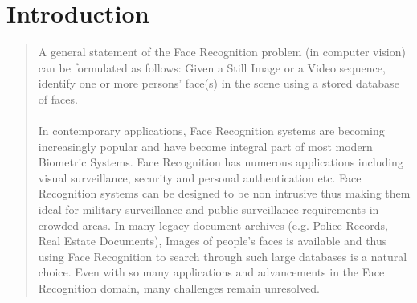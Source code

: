 \section*{Introduction}
\begin{quote}
A general statement of the Face Recognition problem (in computer vision) can be formulated as follows: Given a Still Image or a Video sequence, identify one or more persons' face(s) in the scene using a stored database of faces.\\ 
\\
In contemporary applications, Face Recognition systems are becoming increasingly popular and have become integral part of most modern Biometric Systems.  Face Recognition has   numerous applications   including   visual   surveillance, security and personal authentication etc. Face Recognition systems can be designed to be non intrusive thus making them ideal for military surveillance and public surveillance requirements in crowded areas. In many legacy document archives (e.g. Police Records, Real Estate Documents), Images of people's faces is available and thus using Face Recognition to search through such large databases is a natural choice. Even with so many applications and advancements in the Face Recognition domain, many challenges remain unresolved.
\end{quote}
